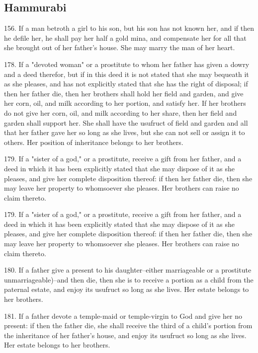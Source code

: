 \documentclass[11pt]{article}
\begin{document}
\subsection{Hammurabi}











156. If a man betroth a girl to his son, but his son has not known her, and if then he defile her, he shall pay her half a gold mina, and compensate her for all that she brought out of her father's house. She may marry the man of her heart.


178. If a "devoted woman" or a prostitute to whom her father has given a dowry and a deed therefor, but if in this deed it is not stated that she may bequeath it as she pleases, and has not explicitly stated that she has the right of disposal; if then her father die, then her brothers shall hold her field and garden, and give her corn, oil, and milk according to her portion, and satisfy her. If her brothers do not give her corn, oil, and milk according to her share, then her field and garden shall support her. She shall have the usufruct of field and garden and all that her father gave her so long as she lives, but she can not sell or assign it to others. Her position of inheritance belongs to her brothers.

179. If a "sister of a god," or a prostitute, receive a gift from her father, and a deed in which it has been explicitly stated that she may dispose of it as she pleases, and give her complete disposition thereof: if then her father die, then she may leave her property to whomsoever she pleases. Her brothers can raise no claim thereto.

179. If a "sister of a god," or a prostitute, receive a gift from her father, and a deed in which it has been explicitly stated that she may dispose of it as she pleases, and give her complete disposition thereof: if then her father die, then she may leave her property to whomsoever she pleases. Her brothers can raise no claim thereto.


180. If a father give a present to his daughter--either marriageable or a prostitute unmarriageable)--and then die, then she is to receive a portion as a child from the paternal estate, and enjoy its usufruct so long as she lives. Her estate belongs to her brothers.


181. If a father devote a temple-maid or temple-virgin to God and give her no present: if then the father die, she shall receive the third of a child's portion from the inheritance of her father's house, and enjoy its usufruct so long as she lives. Her estate belongs to her brothers.
\end{document}
